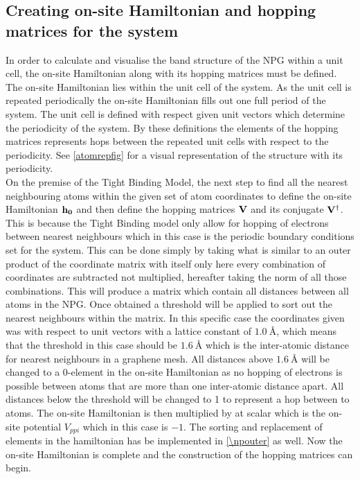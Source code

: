 \subsection{Creating on-site Hamiltonian and hopping matrices for the system}
In order to calculate and visualise the band structure of the NPG within a unit cell, the on-site Hamiltonian along with its hopping matrices must be defined. The on-site Hamiltonian lies within the unit cell of the system. As the unit cell is repeated periodically the on-site Hamiltonian fills out one full period of the system. The unit cell is defined with respect given unit vectors which determine the periodicity of the system. By these definitions the elements of the hopping matrices represents hops between the repeated unit cells with respect to the periodicity. See \cref{atomrepfig} for a visual representation of the structure with its periodicity. \\
On the premise of the Tight Binding Model, the next step to find all the nearest neighbouring atoms within the given set of atom coordinates to define the on-site Hamiltonian \(\bf{h}_0\) and then define the hopping matrices \(\bf{V}\) and its conjugate \(\bf{V}^{\dagger}\). This is because the Tight Binding model only allow for hopping of electrons between nearest neighbours which in this case is the periodic boundary conditions set for the system. This can be done simply by taking what is similar to an outer product of the coordinate matrix with itself only here every combination of coordinates are subtracted not multiplied, hereafter taking the norm of all those combinations. This will produce a matrix which contain all distances between all atoms in the NPG. Once obtained a threshold will be applied to sort out the nearest neighbours within the matrix. In this specific case the coordinates given was with respect to unit vectors with a lattice constant of \(\SI{1.0}{\angstrom}\), which means that the threshold in this case should be \(\SI{1.6}{\angstrom}\) which is the inter-atomic distance for nearest neighbours in a graphene mesh. All distances above \(\SI{1.6}{\angstrom}\) will be changed to a 0-element in the on-site Hamiltonian as no hopping of electrons is possible between atoms that are more than one inter-atomic distance apart. All distances below the threshold will be changed to 1 to represent a hop between to atoms. The on-site Hamiltonian is then multiplied by at scalar which is the on-site potential \(V_{ppi}\) which in this case is \(-1\). The sorting and replacement of elements in the hamiltonian has be implemented in \cref{\npouter} as well. Now the on-site Hamiltonian is complete and the construction of the hopping matrices can begin. \\
